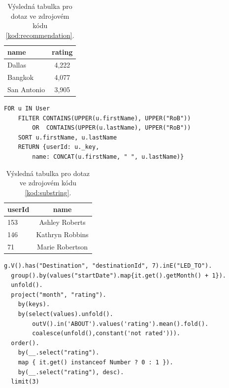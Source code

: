 \documentclass[
  program=infoi,
  biblatex=true,
  figures=true,
  glossaries=false,
  index,
  sourcecodes=true
]{kidiplom}
\begin{document}
\begin{table}[h]
\begin{center}
\caption[Tabulka výsledků pro ukázkový dotaz]{Výsledná tabulka pro dotaz ve zdrojovém kódu \ref{kod:recommendation}.}
\label{tab:recommendation}
\begin{tabular}{ | l | c | }
 \hline
 \textbf{name}  & \textbf{rating} \\
 \hline \hline
 Dallas & 4,222 \\
 Bangkok & 4,077 \\
 San Antonio & 3,905 \\
 \hline
\end{tabular}
\end{center}
\end{table}

\begin{listing}[h]
\begin{verbatim}
FOR u IN User
    FILTER CONTAINS(UPPER(u.firstName), UPPER("RoB"))
        OR  CONTAINS(UPPER(u.lastName), UPPER("RoB"))
    SORT u.firstName, u.lastName
    RETURN {userId: u._key,
    	name: CONCAT(u.firstName, " ", u.lastName)}
\end{verbatim}
\caption[Ukázka dotazu v AQL]{Dotaz v AQL odpovídající na zadání }
\label{kod:substring}
\end{listing}

\begin{table}[h]
\begin{center}
\caption[Tabulka výsledků pro ukázkový dotaz]{Výsledná tabulka pro dotaz ve zdrojovém kódu \ref{kod:substring}.}
\label{tab:substring}
\begin{tabular}{ | l | c | }
 \hline
 \textbf{userId}  & \textbf{name} \\
 \hline \hline
 153 & Ashley Roberts\\
 146 & Kathryn Robbins\\
 71 & Marie Robertson\\
 \hline
\end{tabular}
\end{center}
\end{table}

\begin{listing}[h]
\begin{verbatim}
g.V().has("Destination", "destinationId", 7).inE("LED_TO").
  group().by(values("startDate").map{it.get().getMonth() + 1}).
  unfold().
  project("month", "rating").
    by(keys).
    by(select(values).unfold().
        outV().in('ABOUT').values('rating').mean().fold().
        coalesce(unfold(),constant('not rated'))).
  order().
    by(__.select("rating").
    map { it.get() instanceof Number ? 0 : 1 }).
    by(__.select("rating"), desc).
  limit(3)
\end{verbatim}
\caption[Ukázka dotazu v Gremlinu]{Dotaz v Gremlinu odpovídající na zadání }
\label{kod:favouriteMonth}
\end{listing}
\end{document}
